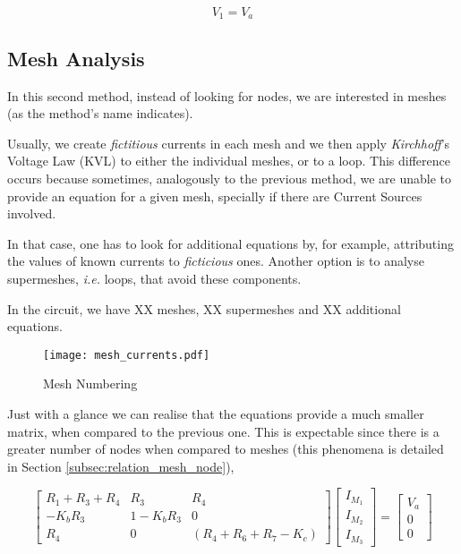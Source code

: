 \begin{equation}
    V_1 = V_a     
\end{equation}

\subsection{Mesh Analysis}
\label{subsec:mesh_analysis}

In this second method, instead of looking for nodes, we are interested in meshes (as the method's name indicates).

Usually, we create \textit{fictitious} currents in each mesh and we then apply \textit{Kirchhoff}'s Voltage Law (KVL) to either the individual meshes, or to a loop. 
This difference occurs because sometimes, analogously to the previous method, we are unable to provide an equation for a given mesh, specially if there are Current Sources involved. 

In that case, one has to look for additional equations by, for example, attributing the values of known currents to \textit{ficticious} ones. Another option is to analyse supermeshes, \textit{i.e.} loops, that avoid these components.

In the circuit, we have XX meshes, XX supermeshes and XX additional equations. 

\begin{figure}[h] \centering
\texttt{[image: mesh\_currents.pdf]}
\caption{Mesh Numbering}
\label{fig:mesh_numbering}
\end{figure}

Just with a glance we can realise that the equations provide a much smaller matrix, when compared to the previous one. This is expectable since there is a greater number of nodes when compared to meshes (this phenomena is detailed in Section \ref{subsec:relation_mesh_node}),

\begin{equation}
\begin{bmatrix}
R_1+R_3+R_4 & R_3 & R_4 \\
-K_bR_3 & 1-K_bR_3 & 0 \\
R_4 & 0 & (R_4+R_6+R_7-K_c)
\end{bmatrix}
\begin{bmatrix}
I_{M_1}\\
I_{M_2} \\
I_{M_3}
\end{bmatrix}
=
\begin{bmatrix}
V_a \\
0 \\
0
\end{bmatrix}
\end{equation}

